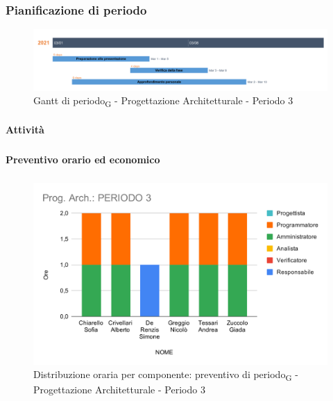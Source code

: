 \subsubsection{Pianificazione di periodo}


\begin{figure}[H]
	\centering
	\includegraphics[scale=0.30]{res/images/gantt_periodo/progarch_3_gantt.png}
	\caption{Gantt di periodo\textsubscript{G} - Progettazione Architetturale - Periodo 3}
\end{figure}

\paragraph{Attività}
\subparagraph*{}

\planningTable{
	
}



\paragraph{Preventivo orario ed economico}
\subparagraph*{}

\contabilitaTable{
	
}

\begin{figure}[H]
	\centering
	\includegraphics[scale=2]{res/images/charts/preventivo/prog_arch_3.png}
	\caption{Distribuzione oraria per componente: preventivo di periodo\textsubscript{G} - Progettazione Architetturale - Periodo 3}
\end{figure}



